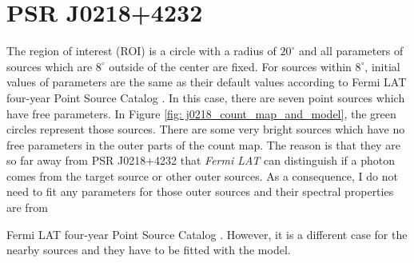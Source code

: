 \documentclass[12pt]{report}
\newcommand{\mycaption}[1]{\protect \caption{#1}}
\newcommand{\fgl}[0]{
  Fermi LAT four-year Point Source Catalog
}
\begin{document}
      \begin{table}[!ht]
        \centering
        \mycaption{Fit results with data from year 2009 to year 2018. The physical 
          meanings of $\Gamma$ and $E_c$ are the same as Table 
          \ref{table: previous_result_comparison}}
        \label{table: 2018_fit_data}
      \end{table}

  \section{PSR J0218+4232}
    The region of interest (ROI) is a circle with a radius of $20^\circ$ and all parameters of
    sources which are $8^\circ$ outside of the center are fixed. For sources within 
    $8^\circ$, initial values of parameters are the same as their default values according 
    to \fgl. In this case, there are seven point sources which have free parameters. In 
    Figure \ref{fig: j0218_count_map_and_model}, the green circles represent those sources.
    There are some very bright sources which have no free parameters
    in the outer parts of the count map. The reason is that they are so far away 
    from PSR J0218+4232 that \textit{Fermi LAT} can distinguish if a photon comes 
    from the target source or other outer sources. As a consequence, I do not need to fit 
    any parameters for those outer sources and their spectral properties are from 
    \fgl{}. However, it is a different case for the nearby sources and they have to be fitted
    with the model.
          
\end{document}
